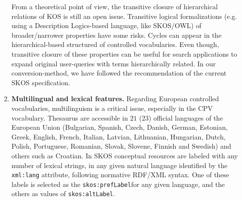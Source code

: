 \begin{enumerate}
 From a theoretical point of view, the transitive closure of hierarchical relations 
 of KOS is still an open issue. Transitive logical formalizations (e.g. using a Description Logics-based language, like SKOS/OWL) 
 of broader/narrower properties have some risks. Cycles can appear in the hierarchical-based structured 
 of controlled vocabularies. Even though, transitive closure of these properties can be useful for 
 search applications to expand original user-queries with terms hierarchically related. In our conversion-method, 
 we have followed the recommendation of the current SKOS specification.
 
 \item \textbf{Multilingual and lexical features.} Regarding European controlled vocabularies, 
 multilinguism is a critical issue, especially in the CPV vocabulary. 
 Thesaurus are accessible in $21$ ($23$) official languages of the European Union 
 (Bulgarian, Spanish, Czech, Danish, German, Estonian, Greek, English, French, Italian, Latvian, Lithuanian, 
 Hungarian, Dutch, Polish, Portuguese, Romanian, Slovak, Slovene, Finnish and Swedish) and others such as Croatian. 
 In SKOS conceptual resources are labeled with any number of lexical strings, in any given natural 
 language identified by the \texttt{xml:lang} attribute, following normative RDF/XML syntax. 
 One of these labels is selected as the \texttt{skos:prefLabel}for any given language, and the 
 others as values of \texttt{skos:altLabel}.
 
\end{enumerate}
